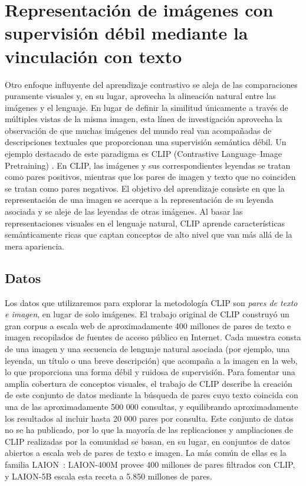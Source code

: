 \documentclass[../../book-main_es.tex]{subfiles}
\begin{document}
\section{Representación de imágenes con supervisión débil mediante la vinculación con texto}\label{sec:CLIP}

Otro enfoque influyente del aprendizaje contrastivo se aleja de las comparaciones 
puramente visuales y, en su lugar, aprovecha la alineación natural entre las 
imágenes y el lenguaje. En lugar de definir la similitud únicamente a través de 
múltiples vistas de la misma imagen, esta línea de investigación aprovecha la observación 
de que muchas imágenes del mundo real van acompañadas de descripciones textuales 
que proporcionan una supervisión semántica débil. Un ejemplo destacado de este 
paradigma es CLIP (Contrastive Language–Image Pretraining) \citep{Radford2021-ir}. 
En CLIP, las imágenes y sus correspondientes leyendas se tratan como pares 
positivos, mientras que los pares de imagen y texto que no coinciden se tratan como 
pares negativos. El objetivo del aprendizaje consiste en que la representación de 
una imagen se acerque a la representación de su leyenda asociada y se aleje de las 
leyendas de otras imágenes. Al basar las representaciones visuales en el lenguaje 
natural, CLIP aprende características semánticamente ricas que captan conceptos de 
alto nivel que van más allá de la mera apariencia.

\subsection{Datos}

Los datos que utilizaremos para explorar la metodología CLIP son {\em pares de texto e imagen}, 
en lugar de solo imágenes. El trabajo original de CLIP construyó un gran corpus a escala web 
de aproximadamente 400 millones de pares de texto e imagen recopilados de fuentes de acceso 
público en Internet. Cada muestra consta de una imagen y una secuencia de lenguaje natural 
asociada (por ejemplo, una leyenda, un título o una breve descripción) que acompaña a la 
imagen en la web, lo que proporciona una forma débil y ruidosa de supervisión. Para fomentar 
una amplia cobertura de conceptos visuales, el trabajo de CLIP describe la creación de este 
conjunto de datos mediante la búsqueda de pares cuyo texto coincida con una de las 
aproximadamente 500 000 consultas, y equilibrando aproximadamente los resultados al 
incluir hasta 20 000 pares por consulta. Este conjunto de datos no se ha publicado, por lo 
que la mayoría de las replicaciones y ampliaciones de CLIP realizadas por la comunidad se 
basan, en su lugar, en conjuntos de datos abiertos a escala web de pares de texto e imagen. 
La más común de ellas es la familia LAION~\citep{schuhmann2022laion5bopenlargescaledataset}: 
LAION-400M provee 400 millones de pares filtrados con CLIP, y LAION-5B escala esta receta
a 5.850 millones de pares.
\end{document}
